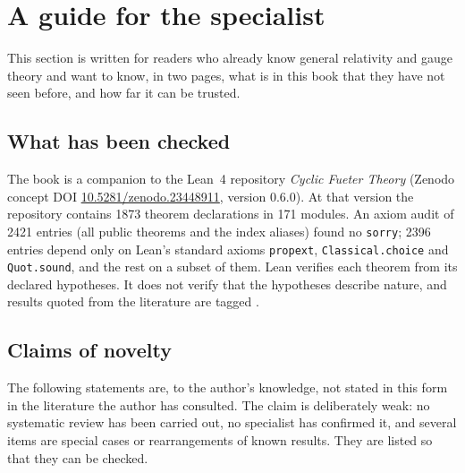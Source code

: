 \chapter*{A guide for the specialist}

This section is written for readers who already know general relativity and gauge theory and want to know, in two pages, what is in this book that they have not seen before, and how far it can be trusted.

\section*{What has been checked}
The book is a companion to the Lean~4 repository \emph{Cyclic Fueter Theory} (Zenodo concept DOI \href{https://doi.org/10.5281/zenodo.23448911}{10.5281/zenodo.23448911}, version 0.6.0).
At that version the repository contains 1873 theorem declarations in 171 modules.
An axiom audit of 2421 entries (all public theorems and the index aliases) found no \texttt{sorry}; 2396 entries depend only on Lean's standard axioms \texttt{propext}, \texttt{Classical.choice} and \texttt{Quot.sound}, and the rest on a subset of them.
Lean verifies each theorem from its declared hypotheses.
It does not verify that the hypotheses describe nature, and results quoted from the literature are tagged \external.

\section*{Claims of novelty}
The following statements are, to the author's knowledge, not stated in this form in the literature the author has consulted.
The claim is deliberately weak: no systematic review has been carried out, no specialist has confirmed it, and several items are special cases or rearrangements of known results.
They are listed so that they can be checked.

